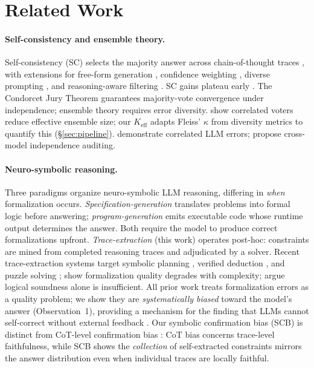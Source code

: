 \section{Related Work}
\label{sec:related-work}

\paragraph{Self-consistency and ensemble theory.}
Self-consistency (SC) selects the majority answer across chain-of-thought traces \citep{wang2023sc}, with extensions for free-form generation \citep{chen2024usc}, confidence weighting \citep{taubenfeld2025cisc}, diverse prompting \citep{li2023diverse}, and reasoning-aware filtering \citep{wan2024rasc, toh2024notallvotes, kim2026reasc}. SC gains plateau early \citep{loo2025reevaluating, byerly2025selfconsistency}. The Condorcet Jury Theorem \citep{condorcet1785} guarantees majority-vote convergence under independence; ensemble theory \citep{dietterich2000ensemble, krogh1994neural} requires error diversity. \citet{ladha1992correlated} show correlated voters reduce effective ensemble size; our $K_\text{eff}$ adapts Fleiss' $\kappa$ from diversity metrics \citep{kuncheva2003measures, brown2005diversity} to quantify this (\S\ref{sec:pipeline}). \citet{kim2025correlated} demonstrate correlated LLM errors; \citet{kuai2026independent} propose cross-model independence auditing.

\paragraph{Neuro-symbolic reasoning.}
Three paradigms organize neuro-symbolic LLM reasoning, differing in \emph{when} formalization occurs.
\emph{Specification-generation} \citep{pan2023logiclm, olausson2023linc, ye2024satlm} translates problems into formal logic before answering; \emph{program-generation} \citep{gao2023pal, chen2023program, lyu2023faithful} emits executable code whose runtime output determines the answer. Both require the model to produce correct formalizations upfront.
\emph{Trace-extraction} (this work) operates post-hoc: constraints are mined from completed reasoning traces and adjudicated by a solver. Recent trace-extraction systems target symbolic planning \citep{ryu2025clover, xu2026dylos, xu2025aristotle}, verified deduction \citep{pei2025fover, singh2026verge, luo2025logicagent}, and puzzle solving \citep{miya2025eidoku}; \citet{amonkar2025realitycheck} show formalization quality degrades with complexity; \citet{chan2026position} argue logical soundness alone is insufficient.
All prior work treats formalization errors as a quality problem; we show they are \emph{systematically biased} toward the model's answer (Observation~1), providing a mechanism for the finding that LLMs cannot self-correct without external feedback \citep{huang2024selfcorrect}. Our symbolic confirmation bias (SCB) is distinct from CoT-level confirmation bias \citep{wan2025unveiling, turpin2023language, jhaveri2026failing}: CoT bias concerns trace-level faithfulness, while SCB shows the \emph{collection} of self-extracted constraints mirrors the answer distribution even when individual traces are locally faithful.

